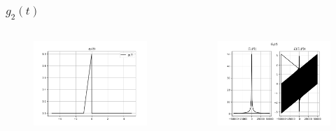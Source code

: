 \documentclass{beamer}
\begin{document}
\begin{frame}
  \frametitle{$g_2(t)$}
 \begin{columns}
\begin{column}{0.5\textwidth}
\begin{figure}
\begin{flushleft}
\includegraphics[width=\columnwidth]{graphs/g2.png}

\end{flushleft}
\end{figure}
\end{column}
\begin{column}{0.5\textwidth}
\begin{figure}
\begin{flushleft}
\includegraphics[width=\columnwidth]{graphs/fourier_g2.png}

\end{flushleft}
\end{figure}
\end{column}
\end{columns}
\end{frame}
\end{document}

